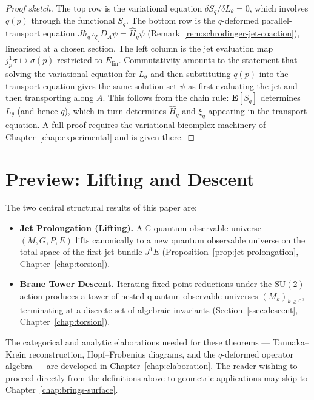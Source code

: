 \documentclass[12pt,a4paper]{report}
\begin{document}
\begin{proof}[Proof sketch]
The top row is the variational equation $\delta S_q / \delta L_\theta = 0$,
which involves $q(p)$ through the functional $S_q$.  The bottom row is the
$q$-deformed parallel-transport equation
$J\hbar_q\,\iota_{\xi_q}D_A\psi = \hat{H}_q\psi$
(Remark~\ref{rem:schrodinger-jet-coaction}), linearised at a chosen section.
The left column is the jet evaluation map
$j^1_p \sigma \mapsto \sigma(p)$ restricted to $E_{\mathrm{lin}}$.
Commutativity amounts to the statement that solving the variational
equation for $L_\theta$ and then substituting $q(p)$ into the transport
equation gives the same solution set $\psi$ as first evaluating the jet
and then transporting along $A$.  This follows from the chain rule:
$\mathbf{E}[S_q]$ determines $L_\theta$ (and hence $q$), which in turn
determines $\hat{H}_q$ and $\xi_q$ appearing in the transport equation.
A full proof requires the variational bicomplex machinery of
Chapter~\ref{chap:experimental} and is given there.
\end{proof}



\section{Preview: Lifting and Descent}
\label{sec:preview-lifting}

The two central structural results of this paper are:
\begin{itemize}
  \item \textbf{Jet Prolongation (Lifting).}  A $\mathbb{C}$ quantum
        observable universe $(M, G, P, E)$ lifts canonically to a new
        quantum observable universe on the total space of the first jet
        bundle $J^1 E$ (Proposition~\ref{prop:jet-prolongation},
        Chapter~\ref{chap:torsion}).
  \item \textbf{Brane Tower Descent.}  Iterating fixed-point reductions
        under the $\mathrm{SU}(2)$ action produces a tower of nested
        quantum observable universes $(M_k)_{k \geq 0}$, terminating at a
        discrete set of algebraic invariants
        (Section~\ref{ssec:descent}, Chapter~\ref{chap:torsion}).
\end{itemize}
The categorical and analytic elaborations needed for these theorems ---
Tannaka--Krein reconstruction, Hopf--Frobenius diagrams, and the
$q$-deformed operator algebra --- are developed in
Chapter~\ref{chap:elaboration}.  The reader wishing to proceed directly
from the definitions above to geometric applications may skip to
Chapter~\ref{chap:brings-surface}.
\end{document}
